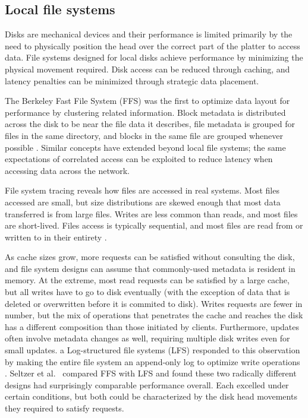 \subsection{Local file systems}

Disks are mechanical devices and their performance is limited primarily by the need to physically position the head over the correct part of the platter to access data. File systems designed for local disks achieve performance by minimizing the physical movement required. Disk access can be reduced through caching, and latency penalties can be minimized through strategic data placement.

The Berkeley Fast File System (FFS) was the first to optimize data layout for performance by clustering related information. Block metadata is distributed across the disk to be near the file data it describes, file metadata is grouped for files in the same directory, and blocks in the same file are grouped whenever possible \cite{mckusick}. Similar concepts have extended beyond local file systems; the same expectations of correlated access can be exploited to reduce latency when accessing data across the network.

File system tracing reveals how files are accessed in real systems. Most files accessed are small, but size distributions are skewed enough that most data transferred is from large files. Writes are less common than reads, and most files are short-lived. Files access is typically sequential, and most files are read from or written to in their entirety \cite{ousterhout,ruemmler,gibson98b}.

As cache sizes grow, more requests can be satisfied without consulting the disk, and file system designs can assume that commonly-used metadata is resident in memory. At the extreme, most read requests can be satisfied by a large cache, but all writes have to go to disk eventually (with the exception of data that is deleted or overwritten before it is commited to disk). Writes requests are fewer in number, but the mix of operations that penetrates the cache and reaches the disk has a different composition than those initiated by clients. Furthermore, updates often involve metadata changes as well, requiring multiple disk writes even for small updates. a Log-structured file systems (LFS) responded to this observation by making the entire file system an append-only log to optimize write operations \cite{rosenblum}. Seltzer et al.\ \cite{seltzer} compared FFS with LFS and found these two radically different designs had surprisingly comparable performance overall. Each excelled under certain conditions, but both could be characterized by the disk head movements they required to satisfy requests.

